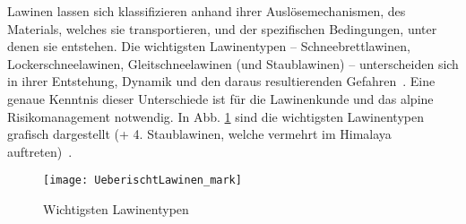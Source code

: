 Lawinen lassen sich klassifizieren anhand ihrer Auslösemechanismen, des Materials, welches sie transportieren, und der spezifischen Bedingungen, unter denen sie entstehen. Die wichtigsten Lawinentypen -- Schneebrettlawinen, Lockerschneelawinen, Gleitschneelawinen (und Staublawinen) -- unterscheiden sich in ihrer Entstehung, Dynamik und den daraus resultierenden Gefahren~\cite{harveyrhynerschweizerlawinenkunde}. Eine genaue Kenntnis dieser Unterschiede ist für die Lawinenkunde und das alpine Risikomanagement notwendig. In Abb. \ref{fig:lawinentypen} sind die wichtigsten Lawinentypen grafisch dargestellt (+ 4. Staublawinen, welche vermehrt im Himalaya auftreten)~\cite{ortovoxlabsnow}.
\begin{figure}[H]
  \centering
  \texttt{[image: UeberischtLawinen\_mark]}
  \caption{Wichtigsten Lawinentypen~\cite{ortovoxlabsnow}}\label{fig:lawinentypen}
\end{figure}
\pagebreak
